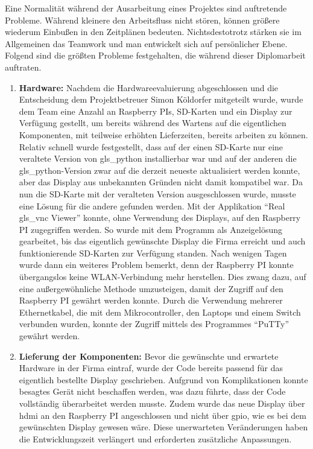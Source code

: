 Eine Normalität während der Ausarbeitung eines Projektes sind auftretende Probleme. Während kleinere den Arbeitsfluss nicht stören, können größere wiederum Einbußen in den Zeitplänen bedeuten. Nichtsdestotrotz stärken sie im Allgemeinen das Teamwork und man entwickelt sich auf persönlicher Ebene.\\ Folgend sind die größten Probleme festgehalten, die während dieser Diplomarbeit auftraten.

\begin{enumerate}

	\item \textbf{Hardware:} Nachdem die Hardwareevaluierung abgeschlossen und die Entscheidung dem Projektbetreuer Simon Köldorfer mitgeteilt wurde, wurde dem Team eine Anzahl an Raspberry PIs, SD-Karten und ein Display zur Verfügung gestellt, um bereits während des Wartens auf die eigentlichen Komponenten, mit teilweise erhöhten Lieferzeiten, bereits arbeiten zu können. Relativ schnell wurde festgestellt, dass auf der einen SD-Karte nur eine veraltete Version von \gls{gls_python} installierbar war und auf der anderen die \gls{gls_python}-Version zwar auf die derzeit neueste aktualisiert werden konnte, aber das Display aus unbekannten Gründen nicht damit kompatibel war. Da nun die SD-Karte mit der veralteten Version ausgeschlossen wurde, musste eine Lösung für die andere gefunden werden. Mit der Applikation \enquote{Real \gls{gls_vnc} Viewer} konnte, ohne Verwendung des Displays, auf den Raspberry PI zugegriffen werden. So wurde mit dem Programm als Anzeigelösung gearbeitet, bis das eigentlich gewünschte Display die Firma erreicht und auch funktionierende SD-Karten zur Verfügung standen. Nach wenigen Tagen wurde dann ein weiteres Problem bemerkt, denn der Raspberry PI konnte übergangslos keine WLAN-Verbindung mehr herstellen. Dies zwang dazu, auf eine außergewöhnliche Methode umzusteigen, damit der Zugriff auf den Raspberry PI gewährt werden konnte. Durch die Verwendung mehrerer Ethernetkabel, die mit dem Mikrocontroller, den Laptops und einem Switch verbunden wurden, konnte der Zugriff mittels des Programmes \enquote{PuTTy} gewährt werden.
	\item \textbf{Lieferung der Komponenten:} Bevor die gewünschte und erwartete Hardware in der Firma eintraf, wurde der Code bereits passend für das eigentlich bestellte Display geschrieben. Aufgrund von Komplikationen konnte besagtes Gerät nicht beschaffen werden, was dazu führte, dass der Code vollständig überarbeitet werden musste. Zudem wurde das neue Display über \ac{hdmi} an den Raspberry PI angeschlossen und nicht über \ac{gpio}, wie es bei dem gewünschten Display gewesen wäre. Diese unerwarteten Veränderungen haben die Entwicklungszeit verlängert und erforderten zusätzliche Anpassungen.

\end{enumerate}
